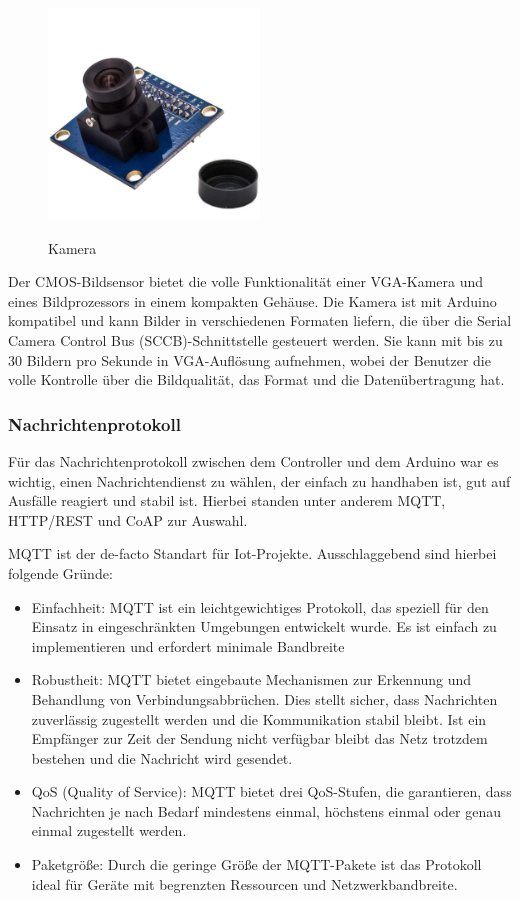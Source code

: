 \begin{figure}[H]
\centering
\includegraphics[width=0.5\textwidth]{images/Kamera.jpg}
\caption{Kamera}\cite{rainpoint_smart_timer}
\label{fig:rainpointDiagram}
\end{figure}

Der CMOS-Bildsensor bietet die volle Funktionalität einer VGA-Kamera und eines Bildprozessors in einem kompakten Gehäuse. Die Kamera ist mit Arduino kompatibel und kann Bilder in verschiedenen Formaten liefern, die über die Serial Camera Control Bus (SCCB)-Schnittstelle gesteuert werden. Sie kann mit bis zu 30 Bildern pro Sekunde in VGA-Auflösung aufnehmen, wobei der Benutzer die volle Kontrolle über die Bildqualität, das Format und die Datenübertragung hat.

\subsubsection{Nachrichtenprotokoll}
Für das Nachrichtenprotokoll zwischen dem Controller und dem Arduino war es wichtig, einen Nachrichtendienst zu wählen, der einfach zu handhaben ist, gut auf Ausfälle reagiert und stabil ist. Hierbei standen unter anderem MQTT, HTTP/REST und CoAP zur Auswahl.

MQTT ist der de-facto Standart für Iot-Projekte. Ausschlaggebend sind hierbei folgende Gründe: \cite{emqx2023mqtt}
\begin{itemize}
    \item Einfachheit: MQTT ist ein leichtgewichtiges Protokoll, das speziell für den Einsatz in eingeschränkten Umgebungen entwickelt wurde. Es ist einfach zu implementieren und erfordert minimale Bandbreite
    \item Robustheit: MQTT bietet eingebaute Mechanismen zur Erkennung und Behandlung von Verbindungsabbrüchen. Dies stellt sicher, dass Nachrichten zuverlässig zugestellt werden und die Kommunikation stabil bleibt. Ist ein Empfänger zur Zeit der Sendung nicht verfügbar bleibt das Netz trotzdem bestehen und die Nachricht wird gesendet.
    \item QoS (Quality of Service): MQTT bietet drei QoS-Stufen, die garantieren, dass Nachrichten je nach Bedarf mindestens einmal, höchstens einmal oder genau einmal zugestellt werden.
    \item Paketgröße: Durch die geringe Größe der MQTT-Pakete ist das Protokoll ideal für Geräte mit begrenzten Ressourcen und Netzwerkbandbreite.
\end{itemize}

